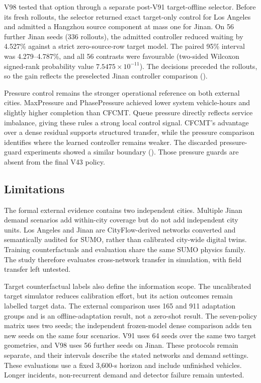 V98 tested that option through a separate post-V91 target-offline selector.
Before its fresh rollouts, the selector returned exact target-only control
for Los Angeles and admitted a Hangzhou source component at mass one for
Jinan.  On 56 further Jinan seeds (336 rollouts), the admitted controller
reduced waiting by 4.527\% against a strict zero-source-row target model.
The paired 95\% interval was 4.279--4.787\%, and all 56 contrasts were
favourable (two-sided Wilcoxon signed-rank probability value
$7.5475\times10^{-11}$).  The decisions preceded the rollouts, so the gain
reflects the preselected Jinan controller comparison
().

Pressure control remains the stronger operational reference on both external
cities.  MaxPressure and PhasePressure achieved lower system vehicle-hours
and slightly higher completion than CFCMT.  Queue pressure directly reflects
service imbalance, giving these rules a strong local control signal.
CFCMT's advantage over a dense residual supports structured transfer, while
the pressure comparison identifies where the learned controller remains
weaker.  The discarded pressure-guard experiments showed a similar boundary
().
Those pressure guards are absent from the final V43 policy.

\subsection{Limitations}

The formal external evidence contains two independent cities.  Multiple Jinan
demand scenarios add within-city coverage but do not add independent city
units.  Los Angeles and Jinan are CityFlow-derived networks converted and
semantically audited for SUMO, rather than calibrated city-wide digital
twins.  Training counterfactuals and evaluation share the same SUMO physics
family.  The study therefore evaluates cross-network transfer in simulation,
with field transfer left untested.

Target counterfactual labels also define the information scope.  The
uncalibrated target simulator reduces calibration effort, but its action
outcomes remain labelled target data.  The external comparison uses 165 and
911 adaptation groups and is an offline-adaptation result, not a zero-shot
result.  The seven-policy matrix uses two seeds; the independent frozen-model
dense comparison adds ten new seeds on the same four scenarios.  V91 uses
64 seeds over the same two target geometries, and V98 uses 56 further seeds on
Jinan.
These protocols remain separate, and their intervals describe the stated
networks and demand settings.  These evaluations use a fixed 3,600-s horizon
and include unfinished vehicles.  Longer incidents, non-recurrent demand and
detector failure remain untested.

